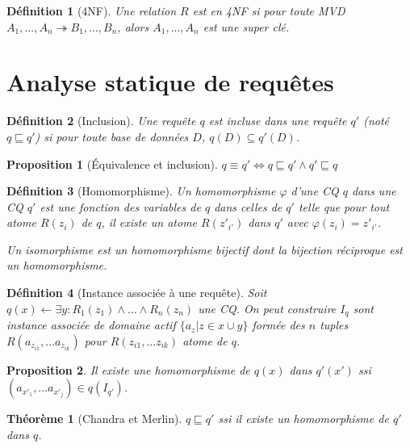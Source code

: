 \documentclass[landscape]{article}
\newcommand{\1}{\mathbbm{1}}
\newcommand{\0}{\mathbbm{0}}
\renewcommand{\phi}{\varphi}
\newtheorem{theo}{Théorème}
\newtheorem{prop}{Proposition}
\newtheorem{defi}{Définition}
\begin{document}
\begin{multicols}{2}
    \begin{defi}[4NF] 
      Une relation $R$ est en 4NF si pour toute MVD $A_1,...,A_n
      \twoheadrightarrow B_1,...,B_n$, alors $A_1,...,A_n$ est une super clé.
    \end{defi}

    \section{Analyse statique de requêtes}

    \begin{defi}[Inclusion]
        Une requête $q$ est incluse dans une requête $q'$ (noté $q\sqsubseteq q'$)
        si pour toute base de données $D$, $q(D)\subseteq q'(D)$.
    \end{defi}

    \begin{prop}[Équivalence et inclusion]
        $q\equiv q' \iff q\sqsubseteq q'\wedge q'\sqsubseteq q$
    \end{prop}

    \begin{defi}[Homomorphisme]
        Un homomorphisme $\phi$ d'une CQ $q$ dans une CQ $q'$ est une fonction
        des variables de $q$ dans celles de $q'$ telle que pour tout atome
        $R(z_i)$ de $q$, il existe un atome $R(z'_{i'})$ dans $q'$ avec
        $\phi(z_i) = z'_{i'}$.

        Un isomorphisme est un homomorphisme bijectif dont la bijection réciproque
        est un homomorphisme.
    \end{defi}

    \begin{defi}[Instance associée à une requête] Soit $q(x) \leftarrow \exists y:
        R_1(z_1)\wedge\ldots\wedge R_n(z_n)$ une CQ. On peut construire $I_q$
        sont instance associée de domaine actif $\{a_z | z\in x\cup y\}$
        formée des $n$ tuples $R(a_{z_{i1}}, \ldots a_{z_{ik}})$ pour
        $R(z_{i1}, \ldots z_{ik})$ atome de $q$.
    \end{defi}

    \begin{prop} Il existe une homomorphisme de $q(x)$ dans $q'(x')$ ssi
        $(a_{x'_1}, \ldots a_{x'_j})\in q(I_{q'})$.
    \end{prop}

    \begin{theo}[Chandra et Merlin] $q\sqsubseteq q'$ ssi il existe un homomorphisme
        de $q'$ dans $q$.
    \end{theo}


\end{multicols}
\end{document}
